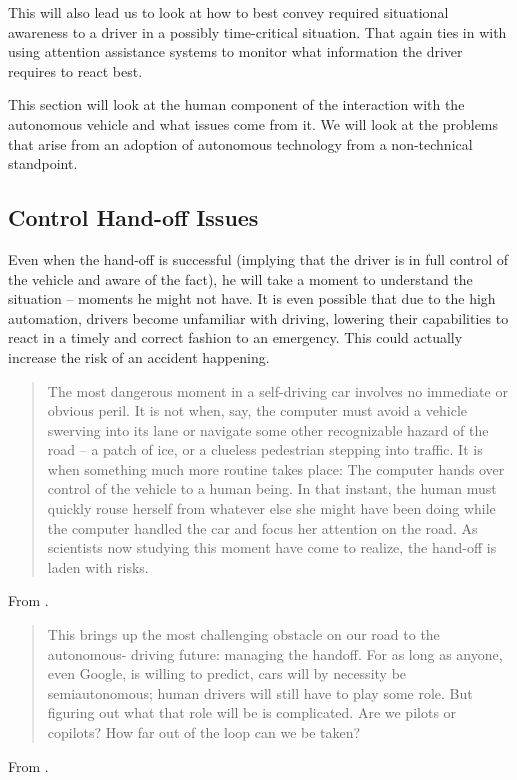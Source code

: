 \documentclass{acm_proc_article-sp}
\begin{document}
This will also lead us to look at how to best convey required situational awareness to a driver in a possibly time-critical situation.
That again ties in with using attention assistance systems to monitor what information the driver requires to react best.

This section will look at the human component of the interaction with the autonomous vehicle and what issues come from it.
We will look at the problems that arise from an adoption of autonomous technology from a non-technical standpoint.

\subsection{Control Hand-off Issues}
\label{hand_off_issue}

Even when the hand-off is successful (implying that the driver is in full control of the vehicle and aware of the fact), he will take a moment to understand the situation – moments he might not have.
It is even possible that due to the high automation, drivers become unfamiliar with driving, lowering their capabilities to react in a timely and correct fashion to an emergency.
This could actually increase the risk of an accident happening.

\begin{quote}
The most dangerous moment in a self-driving car involves no immediate or obvious peril.
It is not when, say, the computer must avoid a vehicle swerving into its lane or navigate some other recognizable hazard of the road -- a patch of ice, or a clueless pedestrian stepping into traffic.
It is when something much more routine takes place: The computer hands over control of the vehicle to a human being.
In that instant, the human must quickly rouse herself from whatever else she might have been doing while the computer handled the car and focus her attention on the road.
As scientists now studying this moment have come to realize, the hand-off is laden with risks.
\end{quote}
From \cite{www:huffington_post}.

\begin{quote}
This brings up the most challenging obstacle on our road to the autonomous- driving future: managing the handoff.
For as long as anyone, even Google, is willing to predict, cars will by necessity be semiautonomous; human drivers will still have to play some role.
But figuring out what that role will be is complicated.
Are we pilots or copilots? How far out of the loop can we be taken?
\end{quote}
From \cite{www:wired}.
\end{document}
